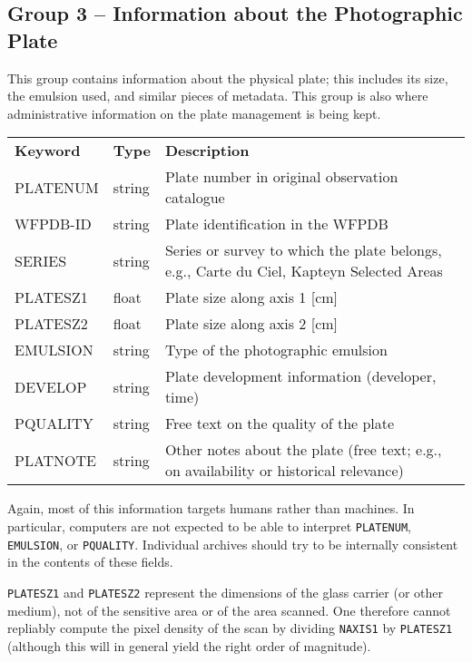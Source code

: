 \documentclass[11pt]{ivoa}
\newcommand\cardname[1]{\texttt{\color{keyword}#1}}
\begin{document}
\subsection{Group 3 – Information about the Photographic Plate}

This group contains information about the physical plate; this includes
its size, the emulsion used, and similar pieces of metadata.  This group
is also where administrative information on the plate management is
being kept.

\begin{inlinetable}
\footnotesize
\begin{tabular}{llp{}}
\sptablerule
\textbf{Keyword}&\textbf{Type}&\textbf{Description}\\
\sptablerule
PLATENUM &string &Plate number in original observation
catalogue\\
WFPDB-ID &string &Plate identification in the WFPDB\\
SERIES   &string &Series or survey to which the plate belongs,
e.g., Carte du Ciel, Kapteyn Selected Areas\\
PLATESZ1 &float  &Plate size along axis 1 [cm]\\
PLATESZ2 &float  &Plate size along axis 2 [cm]\\
EMULSION &string &Type of the photographic emulsion\\
DEVELOP  &string &Plate development information (developer,
time)\\
PQUALITY &string &Free text on the quality of the plate\\
PLATNOTE &string &Other notes about the plate (free text; e.g., on
availability or historical relevance)\\
\end{tabular}
\end{inlinetable}

Again, most of this information targets humans rather than machines.  In
particular, computers are not expected to be able to interpret
\cardname{PLATENUM}, \cardname{EMULSION}, or \cardname{PQUALITY}.
Individual archives should try to be internally consistent in the
contents of these fields.

\cardname{PLATESZ1} and \cardname{PLATESZ2} represent the dimensions of
the glass carrier (or other medium), not of the sensitive area or of the area scanned.
One therefore cannot repliably compute the pixel density of the scan by
dividing \cardname{NAXIS1} by \cardname{PLATESZ1} (although this will in
general yield the right order of magnitude).
\end{document}
